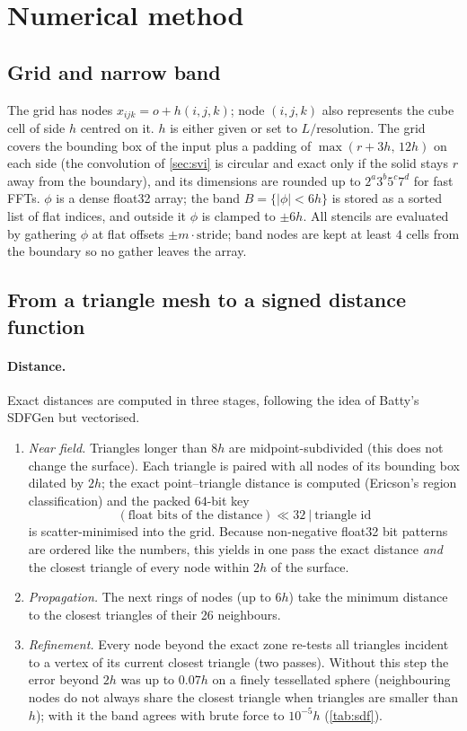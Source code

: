 \documentclass[11pt]{article}
\begin{document}
\section{Numerical method}

\subsection{Grid and narrow band}

The grid has nodes $x_{ijk}=o+h(i,j,k)$; node $(i,j,k)$ also represents the cube cell of side $h$
centred on it. $h$ is either given or set to $L/\text{resolution}$. The grid covers the bounding box of
the input plus a padding of $\max(r+3h,\,12h)$ on each side (the convolution of \cref{sec:svi} is
circular and exact only if the solid stays $r$ away from the boundary), and its dimensions are rounded
up to $2^a3^b5^c7^d$ for fast FFTs. $\phi$ is a dense float32 array; the band $B=\{|\phi|<6h\}$ is stored
as a sorted list of flat indices, and outside it $\phi$ is clamped to $\pm6h$. All stencils are
evaluated by gathering $\phi$ at flat offsets $\pm m\cdot\mathrm{stride}$; band nodes are kept at least
$4$ cells from the boundary so no gather leaves the array.

\subsection{From a triangle mesh to a signed distance function}\label{sec:sdf}

\paragraph{Distance.} Exact distances are computed in three stages, following the idea of Batty's SDFGen
but vectorised.
\begin{enumerate}
\item \emph{Near field.} Triangles longer than $8h$ are midpoint-subdivided (this does not change the
surface). Each triangle is paired with all nodes of its bounding box dilated by $2h$; the exact
point--triangle distance is computed (Ericson's region classification) and the packed $64$-bit key
\[(\text{float bits of the distance})\ll 32\ \big|\ \text{triangle id}\]
is scatter-minimised into the grid. Because non-negative float32 bit patterns are ordered like the
numbers, this yields in one pass the exact distance \emph{and} the closest triangle of every node within
$2h$ of the surface.
\item \emph{Propagation.} The next rings of nodes (up to $6h$) take the minimum distance to the closest
triangles of their 26 neighbours.
\item \emph{Refinement.} Every node beyond the exact zone re-tests all triangles incident to a vertex of
its current closest triangle (two passes). Without this step the error beyond $2h$ was up to $0.07h$ on a
finely tessellated sphere (neighbouring nodes do not always share the closest triangle when triangles are
smaller than $h$); with it the band agrees with brute force to $10^{-5}h$ (\cref{tab:sdf}).
\end{enumerate}
\end{document}
